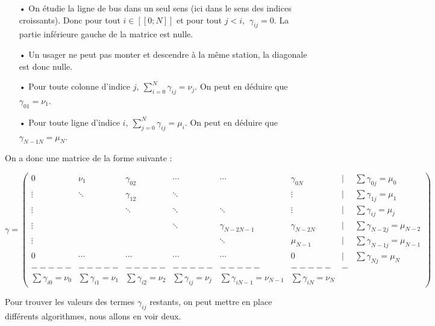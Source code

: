 \documentclass[12pt]{article}
\newcommand{\dcrochetg}{[\![}
\newcommand{\dcrochetd}{]\!]}
\begin{document}
\begin{itemize}
    \item[•] On étudie la ligne de bus dans un seul sens (ici dans le sens des indices croissants). Donc pour tout $i \in \dcrochetg 0;N\dcrochetd$ et pour tout  $j < i$, $\: \gamma_{ij} = 0$. La partie inférieure gauche de la matrice est nulle.\\
    \item[•] Un usager ne peut pas monter et descendre à la même station, la diagonale est donc nulle.\\
    \item[•] Pour toute colonne d'indice $j, \: \sum^{N}_{i=0} \gamma_{ij} = \nu_j$. On peut en déduire que $\gamma_{01} = \nu_1$.\\
    \item[•] Pour toute ligne d'indice $i, \: \sum^{N}_{j=0} \gamma_{ij} = \mu_i$. On peut en déduire que $\gamma_{N-1N} = \mu_N$.\\
\end{itemize}
On a donc une matrice de la forme suivante :
\begin{adjustwidth}{-2cm}{-2cm}
\[\gamma = 
\begin{pmatrix}
0 & \nu_1 &\gamma_{02} & \cdots &  \cdots &\gamma_{0N} & | &\sum \gamma_{0j} = \mu_0 \\
\vdots & \ddots & \gamma_{12} & \ddots & &\vdots & | &\sum \gamma_{1j} = \mu_1 \\
\vdots & & \ddots & \ddots & \ddots & \vdots &| &\sum \gamma_{ij} = \mu_j\\
\vdots &  & & \ddots & \gamma_{N-2N-1}&\gamma_{N-2N}& |& \sum \gamma_{N-2j} = \mu_{N-2}\\
\vdots &  & & & \ddots &\mu_{N-1}& |& \sum \gamma_{N-1j} = \mu_{N-1}\\
0 & \cdots & \cdots & \cdots & \cdots & 0& | &\sum \gamma_{Nj} = \mu_N\\
----- & -----& -----&-----&-----&-----&-\\
\sum \gamma_{i0} = \nu_0 & \sum \gamma_{i1} = \nu_1 & \sum \gamma_{i2} = \nu_2 & \sum \gamma_{ij} = \nu_j & \sum \gamma_{iN-1} = \nu_{N-1} & \sum \gamma_{iN} = \nu_N
\end{pmatrix}\]
\end{adjustwidth}

Pour trouver les valeurs des termes $\gamma_{ij}$ restants, on peut mettre en place différents algorithmes, nous allons en voir deux.
\end{document}
